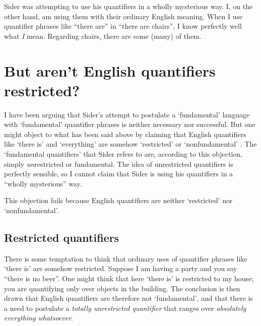 \documentclass[11pt]{article}
\begin{document}
\begin{spacing}{1.25}
Sider was attempting to use his quantifiers in a wholly mysterious
way.  I, on the other hand, am using them with their ordinary English
meaning.  When I use quantifier phrases like ``there are'' in ``there
are chairs'', I know perfectly well what {\em I} mean.  Regarding
chairs, there are some (many) of them.


\section{But aren't English quantifiers restricted?}
\label{eng-quant}
I have been arguing that Sider's attempt to postulate a `fundamental'
language with `fundamental' quantifier phrases is neither necessary
nor successful.  But one might object to what has been said above by
claiming that English quantifiers like `there is' and `everything' are
somehow `restricted' or `nonfundamental' \citep[127]{sider2011d}.  The
`fundamental quantifiers' that Sider refers to are, according to this
objection, simply {\em un}restricted or fundamental.  The idea of
unrestricted quantifiers is perfectly sensible, so I cannot claim that
Sider is using his quantifiers in a ``wholly mysterious'' way.

This objection fails because English quantifiers are neither
`restricted' nor `nonfundamental'.

\subsection{Restricted quantifiers}
\label{restrict}
There is some temptation to think that ordinary uses of quantifier
phrases like `there is' are somehow restricted.  Suppose I am having a
party and you say ``there is no beer''.  One might think that here
`there is' is restricted to my house; you are quantifying only over
objects in the building.  The conclusion is then drawn that English
quantifiers are therefore not `fundamental', and that there is a need
to postulate a {\em totally unrestricted quantifier} that ranges over
{\em absolutely everything whatsoever}.


\end{spacing}
\end{document}
